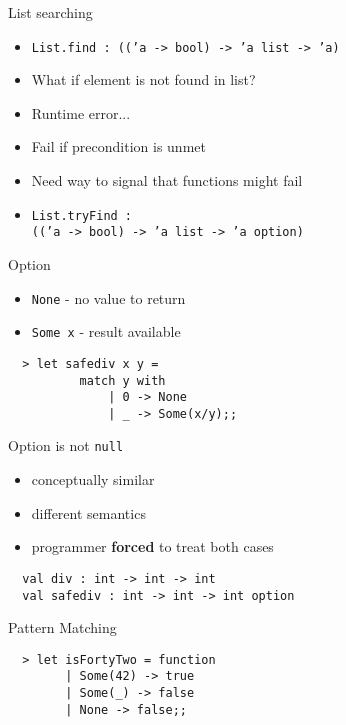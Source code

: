 \documentclass{beamer}
\begin{document}
\begin{frame}{List searching}
  \begin{itemize}[<+->]
    \item \texttt{List.find : (('a -> bool) -> 'a list -> 'a)}
    \item What if element is not found in list?
    \item Runtime error...
    \item Fail if precondition is unmet
    \item Need way to signal that functions might fail
    \item \texttt{List.tryFind :\\ (('a -> bool) -> 'a list -> 'a option)}
  \end{itemize}
\end{frame}

\begin{frame}[fragile]{Option}
  \begin{itemize}
    \item \texttt{None} - no value to return
    \item \texttt{Some x} - result available
  \end{itemize}
  \pause
  \begin{verbatim}
  > let safediv x y =
          match y with
              | 0 -> None
              | _ -> Some(x/y);;
  \end{verbatim}
\end{frame}

\begin{frame}[fragile]{Option is not \texttt{null}}
  \begin{itemize}
    \item conceptually similar
    \item different semantics
    \item programmer \textbf{forced} to treat both cases
  \end{itemize}
  \begin{verbatim}
  val div : int -> int -> int
  val safediv : int -> int -> int option
  \end{verbatim}
\end{frame}

\begin{frame}[fragile,label=maybe]{Pattern Matching}
  \begin{verbatim}
  > let isFortyTwo = function
        | Some(42) -> true
        | Some(_) -> false
        | None -> false;;
  \end{verbatim}
\end{frame}
\end{document}
